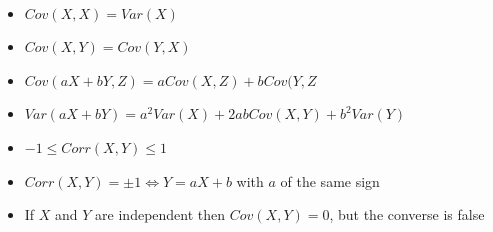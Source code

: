 \begin{prop} $ $
  \begin{itemize}
      
\item $Cov(X,X) = Var(X)$
\item $Cov(X, Y) = Cov(Y,X)$
\item $Cov(a X + bY, Z) = a Cov(X,Z) + b Cov(Y,Z$
\item $Var(a X + b Y) = a^2 Var(X) + 2abCov(X,Y) + b^2 Var(Y)$
\item $-1 \leq Corr(X,Y) \leq 1$
\item $Corr(X,Y) = \pm 1 \iff Y = a X + b$ with $a$ of the same sign
\item If $X$ and $Y$ are independent then $Cov(X, Y) = 0$, but the converse is false

  \end{itemize}
\end{prop}
